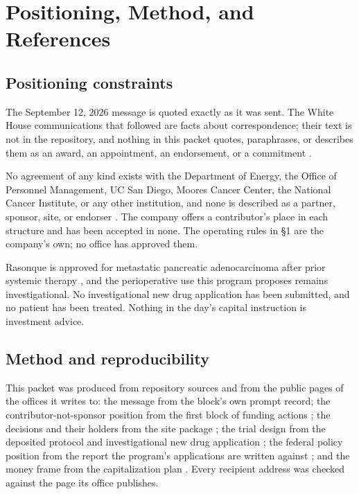 \section{Positioning, Method, and References}

\subsection{Positioning constraints}

The September 12, 2026 message is quoted exactly as it was sent. The White House
communications that followed are facts about correspondence; their text is not
in the repository, and nothing in this packet quotes, paraphrases, or describes
them as an award, an appointment, an endorsement, or a commitment
\cite{whcontact2026}.

No agreement of any kind exists with the Department of Energy, the Office of
Personnel Management, UC San Diego, Moores Cancer Center, the National Cancer
Institute, or any other institution, and none is described as a partner,
sponsor, site, or endorser \cite{doegenesis2026,ucsdmoorescto2026,ctep2026}. The
company offers a contributor's place in each structure and has been accepted in
none. The operating rules in \S1 are the company's own; no office has approved
them.

Rasonque is approved for metastatic pancreatic adenocarcinoma after prior
systemic therapy \cite{fdarasonque2026}, and the perioperative use this program
proposes remains investigational. No investigational new drug application has
been submitted, and no patient has been treated. Nothing in the day's capital
instruction is investment advice.

\subsection{Method and reproducibility}

This packet was produced from repository sources and from the public pages of
the offices it writes to: the message from the block's own prompt record; the
contributor-not-sponsor position from the first block of funding actions
\cite{autofund2026}; the decisions and their holders from the site package
\cite{movein2026}; the trial design from the deposited protocol and
investigational new drug application \cite{onpremwhippl,phase1ind}; the federal
policy position from the report the program's applications are written against
\cite{kratsios2026sciencegoldenage,eo14303goldstandard}; and the money frame from
the capitalization plan \cite{capitalplan2026}. Every recipient address was
checked against the page its office publishes.

